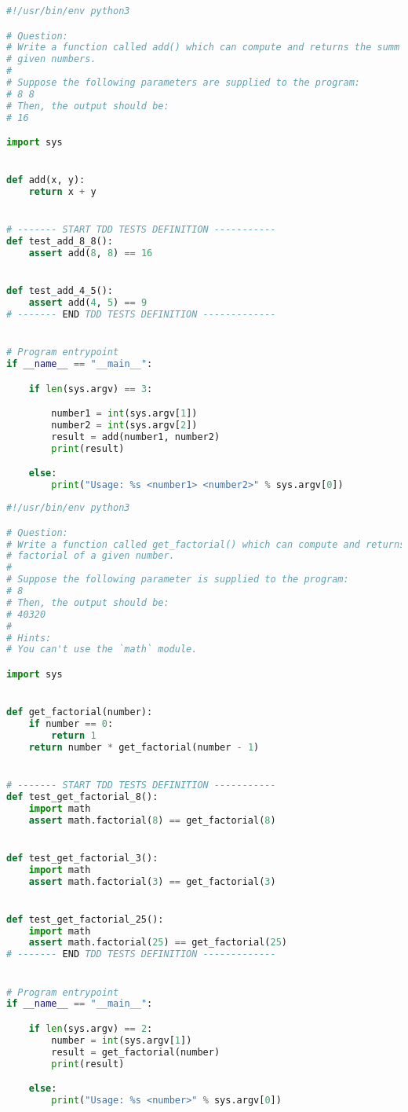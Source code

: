 \begin{lstlisting}[language=python,caption={exercise\_2.py},captionpos=b]
#!/usr/bin/env python3

# Question:
# Write a function called add() which can compute and returns the summ of two
# given numbers.
#
# Suppose the following parameters are supplied to the program:
# 8 8
# Then, the output should be:
# 16

import sys


def add(x, y):
    return x + y


# ------- START TDD TESTS DEFINITION -----------
def test_add_8_8():
    assert add(8, 8) == 16


def test_add_4_5():
    assert add(4, 5) == 9
# ------- END TDD TESTS DEFINITION -------------


# Program entrypoint
if __name__ == "__main__":

    if len(sys.argv) == 3:

        number1 = int(sys.argv[1])
        number2 = int(sys.argv[2])
        result = add(number1, number2)
        print(result)

    else:
        print("Usage: %s <number1> <number2>" % sys.argv[0])
\end{lstlisting}

\begin{lstlisting}[language=python,caption={exercise\_3.py},captionpos=b]
#!/usr/bin/env python3

# Question:
# Write a function called get_factorial() which can compute and returns the
# factorial of a given number.
#
# Suppose the following parameter is supplied to the program:
# 8
# Then, the output should be:
# 40320
#
# Hints:
# You can't use the `math` module.

import sys


def get_factorial(number):
    if number == 0:
        return 1
    return number * get_factorial(number - 1)


# ------- START TDD TESTS DEFINITION -----------
def test_get_factorial_8():
    import math
    assert math.factorial(8) == get_factorial(8)


def test_get_factorial_3():
    import math
    assert math.factorial(3) == get_factorial(3)


def test_get_factorial_25():
    import math
    assert math.factorial(25) == get_factorial(25)
# ------- END TDD TESTS DEFINITION -------------


# Program entrypoint
if __name__ == "__main__":

    if len(sys.argv) == 2:
        number = int(sys.argv[1])
        result = get_factorial(number)
        print(result)

    else:
        print("Usage: %s <number>" % sys.argv[0])
\end{lstlisting}

